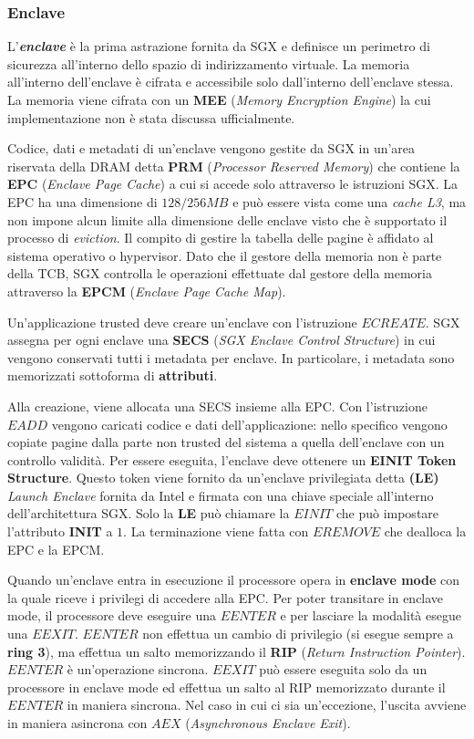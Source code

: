 \documentclass{article}
\begin{document}
\subsubsection{Enclave}\label{sec:enclave}
L'\textbf{\textit{enclave}}\cite{Costan2016} è la prima astrazione fornita da SGX e definisce un perimetro di sicurezza all'interno dello spazio di indirizzamento virtuale. La memoria all'interno dell'enclave è cifrata e accessibile solo dall'interno dell'enclave stessa. La memoria viene cifrata con un \textbf{MEE} (\textit{Memory Encryption Engine}) la cui implementazione non è stata discussa ufficialmente.

Codice, dati e metadati di un'enclave vengono gestite da SGX in un'area riservata della DRAM detta \textbf{PRM} (\textit{Processor Reserved Memory}) che contiene la \textbf{EPC} (\textit{Enclave Page Cache}) a cui si accede solo attraverso le istruzioni SGX. La EPC ha una dimensione di $128/256 MB$ e può essere vista come una \textit{cache L3}, ma non impone alcun limite alla dimensione delle enclave visto che è supportato il processo di \textit{eviction}. Il compito di gestire la tabella delle pagine è affidato al sistema operativo o hypervisor. Dato che il gestore della memoria non è parte della TCB, SGX controlla le operazioni effettuate dal gestore della memoria attraverso la \textbf{EPCM} (\textit{Enclave Page Cache Map}).

Un'applicazione trusted deve creare un'enclave con l'istruzione $ECREATE$. SGX assegna per ogni enclave una \textbf{SECS} (\textit{SGX Enclave Control Structure}) in cui vengono conservati tutti i metadata per enclave. In particolare, i metadata sono memorizzati sottoforma di \textbf{attributi}.

Alla creazione, viene allocata una SECS insieme alla EPC. Con l'istruzione $EADD$ vengono caricati codice e dati dell'applicazione: nello specifico vengono copiate pagine dalla parte non trusted del sistema a quella dell'enclave con un controllo validità.
Per essere eseguita, l'enclave deve ottenere un \textbf{EINIT Token Structure}. Questo token viene fornito da un'enclave privilegiata detta \textbf{(LE)} \textit{Launch Enclave} fornita da Intel e firmata con una chiave speciale all'interno dell'architettura SGX. Solo la \textbf{LE} può chiamare la $EINIT$ che può impostare l'attributo \textbf{INIT} a $1$. La terminazione viene fatta con $EREMOVE$ che dealloca la EPC e la EPCM.

Quando un'enclave entra in esecuzione il processore opera in \textbf{enclave mode} con la quale riceve i privilegi di accedere alla EPC. Per poter transitare in enclave mode, il processore deve eseguire una $EENTER$ e per lasciare la modalità esegue una $EEXIT$. $EENTER$ non effettua un cambio di privilegio (si esegue sempre a \textbf{ring 3}), ma effettua un salto memorizzando il \textbf{RIP} (\textit{Return Instruction Pointer}). $EENTER$ è un'operazione sincrona. $EEXIT$ può essere eseguita solo da un processore in enclave mode ed effettua un salto al RIP memorizzato durante il $EENTER$ in maniera sincrona. Nel caso in cui ci sia un'eccezione, l'uscita avviene in maniera asincrona con $AEX$ (\textit{Asynchronous Enclave Exit}).
\end{document}
